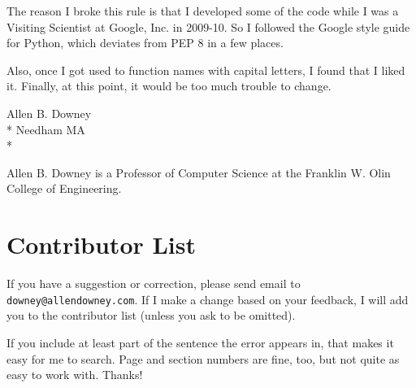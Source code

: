 \documentclass[12pt]{book}
\begin{document}
The reason I broke this rule is that I developed some of the
code while I was a Visiting Scientist at Google, Inc. in 2009-10.
So I followed the Google style guide for Python, which deviates
from PEP 8 in a few places.

Also, once I got used to function names with capital letters, I
found that I liked it.  Finally, at this point, it would be too
much trouble to change.


Allen B. Downey \\*
Needham MA \\*

Allen B. Downey is a Professor of Computer Science at 
the Franklin W. Olin College of Engineering.







\section*{Contributor List}

If you have a suggestion or correction, please send email to 
{\tt downey@allendowney.com}.  If I make a change based on your
feedback, I will add you to the contributor list
(unless you ask to be omitted).

If you include at least part of the sentence the
error appears in, that makes it easy for me to search.  Page and
section numbers are fine, too, but not quite as easy to work with.
Thanks!

\small
\end{document}
